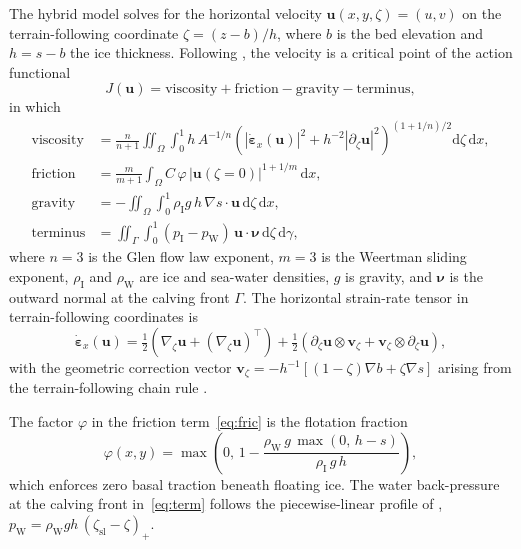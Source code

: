 The hybrid model solves for the horizontal velocity
$\bm u(x,y,\zeta) = (u, v)$ on the terrain-following coordinate
$\zeta = (z-b)/h$, where $b$ is the bed elevation and
$h = s - b$ the ice thickness. Following \citet{Shapero2021}, the
velocity is a critical point of the action functional
\begin{equation}
\label{eq:action}
J(\bm u) = \mathrm{viscosity} + \mathrm{friction}
        - \mathrm{gravity} - \mathrm{terminus},
\end{equation}
in which
\begin{align}
\mathrm{viscosity} &=
   \frac{n}{n+1}\!\iint_\Omega\!\!\int_0^1
   h\, A^{-1/n}\!\left(|\dot{\bm\varepsilon}_x(\bm u)|^2
                       + h^{-2}|\partial_\zeta \bm u|^2\right)^{(1+1/n)/2}
   \mathrm d\zeta\,\mathrm d x,
   \label{eq:visc}\\[2pt]
\mathrm{friction} &=
   \frac{m}{m+1}\!\int_\Omega C\,\varphi\,
                  |\bm u(\zeta\!=\!0)|^{1+1/m}\,\mathrm d x,
   \label{eq:fric}\\[2pt]
\mathrm{gravity} &=
   -\!\iint_\Omega\!\!\int_0^1 \rho_\mathrm I g\,h\,
                  \nabla s\!\cdot\!\bm u\,\mathrm d\zeta\,\mathrm d x,
   \label{eq:grav}\\[2pt]
\mathrm{terminus} &=
   \!\iint_\Gamma\!\!\int_0^1 (p_\mathrm I - p_\mathrm W)\,
                 \bm u\!\cdot\!\bm\nu\,\mathrm d\zeta\,\mathrm d\gamma,
   \label{eq:term}
\end{align}
where $n=3$ is the Glen flow law exponent, $m=3$ is the Weertman
sliding exponent, $\rho_\mathrm I$ and $\rho_\mathrm W$ are ice and
sea-water densities, $g$ is gravity, and $\bm\nu$ is the outward
normal at the calving front $\Gamma$. The horizontal strain-rate
tensor in terrain-following coordinates is
\begin{equation}
\dot{\bm\varepsilon}_x(\bm u)
   = \tfrac{1}{2}\left(\nabla_\zeta\bm u
                       + (\nabla_\zeta\bm u)^{\!\top}\right)
     + \tfrac{1}{2}\left(\partial_\zeta\bm u\otimes\bm v_\zeta
                         + \bm v_\zeta\otimes\partial_\zeta\bm u\right),
   \label{eq:eh}
\end{equation}
with the geometric correction vector
$\bm v_\zeta = -h^{-1}[(1-\zeta)\nabla b + \zeta\nabla s]$
arising from the terrain-following chain rule
\citep[][Eq.~19]{Shapero2021}.

The factor $\varphi$ in the friction term~\eqref{eq:fric} is the
flotation fraction
\begin{equation}
\varphi(x,y) = \max\!\left(0,\,
   1 - \frac{\rho_\mathrm W\,g\,\max(0,\,h-s)}{\rho_\mathrm I\,g\,h}\right),
   \label{eq:phi}
\end{equation}
which enforces zero basal traction beneath floating ice. The water
back-pressure at the calving front in~\eqref{eq:term} follows the
piecewise-linear profile of \citet{Shapero2021},
$p_\mathrm W = \rho_\mathrm W g h\,(\zeta_\mathrm{sl} - \zeta)_+$.

